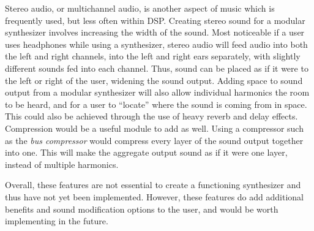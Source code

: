 Stereo audio, or multichannel audio, is another aspect of music which is frequently used, but less often within DSP. Creating stereo sound for a modular synthesizer involves increasing the width of the sound. Most noticeable if a user uses headphones while using a synthesizer, stereo audio will feed audio into both the left and right channels, into the left and right ears separately, with slightly different sounds fed into each channel. Thus, sound can be placed as if it were to the left or right of the user, widening the sound output. Adding space to sound output from a modular synthesizer will also allow individual harmonics the room to be heard, and for a user to ``locate'' where the sound is coming from in space. This could also be achieved through the use of heavy reverb and delay effects. Compression would be a useful module to add as well. Using a compressor such as the \textit{bus compressor} would compress every layer of the sound output together into one. This will make the aggregate output sound as if it were one layer, instead of multiple harmonics.

Overall, these features are not essential to create a functioning synthesizer and thus have not yet been implemented. However, these features do add additional benefits and sound modification options to the user, and would be worth implementing in the future. 